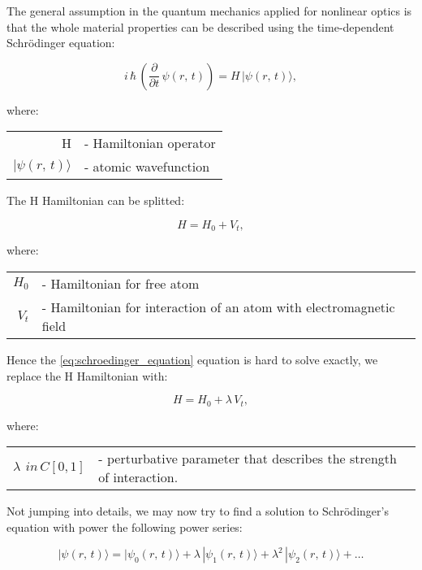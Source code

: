 \documentclass[12pt,twoside,a4paper]{article}
\numberwithin{equation}{subsection}
\numberwithin{figure}{subsection}
\newcommand{\ket}[1]{|#1\rangle}
\begin{document}
The general assumption in the quantum mechanics applied for nonlinear optics is that the whole material properties can be described
using the time-dependent Schrödinger equation:

\begin{equation} \label{eq:schroedinger_equation}
  i\,\hbar\,({\frac {\partial }{\partial t}}\,\psi (r, \,t))=H\, \ket{ \psi(r, \,t) },
\end{equation}

where: 

\begin{tabular}{ r l}
  H & - Hamiltonian operator \\
  $\ket{\psi(r,\,t)}$ & - atomic wavefunction \\
\end{tabular}


The H Hamiltonian can be splitted:

\begin{equation} \label{eq:schroedinger_hamiltonian}
  H={H_{0}} + {V_{t}},
\end{equation}

where:

\begin{tabular} {r l}
  ${H_{0}}$ & - Hamiltonian for free atom \\
  ${V_{t}}$ & - Hamiltonian for interaction of an atom with electromagnetic field \\
\end{tabular}


Hence the \ref{eq:schroedinger_equation} equation is hard to solve exactly, we replace the H Hamiltonian with:

\begin{equation} \label{eq:shamiltionian_replaced}
  H = {H_{0}} + \lambda \,{V_{t}},
\end{equation}

where: 

\begin{tabular} {r l}
  $\lambda \,\ in \,C[0, 1]$ & - perturbative parameter that describes the strength of interaction. 
\end{tabular}



Not jumping into details, we may now try to find a solution to Schrödinger's equation with power the following power series:

\begin{equation} \label{eq:schrodinger_solution}
  \ket{\psi (r, \,t) } = \ket{ \psi_{0}(r, \,t)} + \lambda \,\ket{\psi_{1}(r, \,t)} + \lambda^{2}\,\ket{\psi_{2}(r, \,t) } +
  \ldots
\end{equation}
\end{document}
